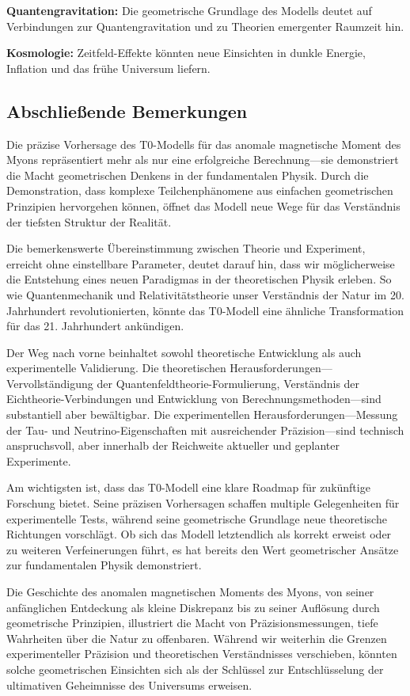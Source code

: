 \documentclass[12pt,a4paper]{article}
\begin{document}
\textbf{Quantengravitation:}
Die geometrische Grundlage des Modells deutet auf Verbindungen zur Quantengravitation und zu Theorien emergenter Raumzeit hin.

\textbf{Kosmologie:}
Zeitfeld-Effekte könnten neue Einsichten in dunkle Energie, Inflation und das frühe Universum liefern.

\subsection{Abschließende Bemerkungen}

Die präzise Vorhersage des T0-Modells für das anomale magnetische Moment des Myons repräsentiert mehr als nur eine erfolgreiche Berechnung—sie demonstriert die Macht geometrischen Denkens in der fundamentalen Physik. Durch die Demonstration, dass komplexe Teilchenphänomene aus einfachen geometrischen Prinzipien hervorgehen können, öffnet das Modell neue Wege für das Verständnis der tiefsten Struktur der Realität.

Die bemerkenswerte Übereinstimmung zwischen Theorie und Experiment, erreicht ohne einstellbare Parameter, deutet darauf hin, dass wir möglicherweise die Entstehung eines neuen Paradigmas in der theoretischen Physik erleben. So wie Quantenmechanik und Relativitätstheorie unser Verständnis der Natur im 20. Jahrhundert revolutionierten, könnte das T0-Modell eine ähnliche Transformation für das 21. Jahrhundert ankündigen.

Der Weg nach vorne beinhaltet sowohl theoretische Entwicklung als auch experimentelle Validierung. Die theoretischen Herausforderungen—Vervollständigung der Quantenfeldtheorie-Formulierung, Verständnis der Eichtheorie-Verbindungen und Entwicklung von Berechnungsmethoden—sind substantiell aber bewältigbar. Die experimentellen Herausforderungen—Messung der Tau- und Neutrino-Eigenschaften mit ausreichender Präzision—sind technisch anspruchsvoll, aber innerhalb der Reichweite aktueller und geplanter Experimente.

Am wichtigsten ist, dass das T0-Modell eine klare Roadmap für zukünftige Forschung bietet. Seine präzisen Vorhersagen schaffen multiple Gelegenheiten für experimentelle Tests, während seine geometrische Grundlage neue theoretische Richtungen vorschlägt. Ob sich das Modell letztendlich als korrekt erweist oder zu weiteren Verfeinerungen führt, es hat bereits den Wert geometrischer Ansätze zur fundamentalen Physik demonstriert.

Die Geschichte des anomalen magnetischen Moments des Myons, von seiner anfänglichen Entdeckung als kleine Diskrepanz bis zu seiner Auflösung durch geometrische Prinzipien, illustriert die Macht von Präzisionsmessungen, tiefe Wahrheiten über die Natur zu offenbaren. Während wir weiterhin die Grenzen experimenteller Präzision und theoretischen Verständnisses verschieben, könnten solche geometrischen Einsichten sich als der Schlüssel zur Entschlüsselung der ultimativen Geheimnisse des Universums erweisen.
\end{document}
